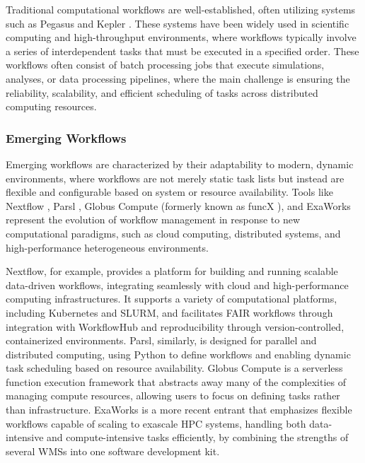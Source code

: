 \documentclass[sigconf]{acmart}
\begin{document}
Traditional computational workflows are well-established, often utilizing systems such as Pegasus \citep{www-pegasus} and Kepler \citep{www-kepler}. These systems have been widely used in scientific computing and high-throughput environments, where workflows typically involve a series of interdependent tasks that must be executed in a specified order. These workflows often consist of batch processing jobs that execute simulations, analyses, or data processing pipelines, where the main challenge is ensuring the reliability, scalability, and efficient scheduling of tasks across distributed computing resources.


\subsubsection{Emerging Workflows}

Emerging workflows are characterized by their adaptability to modern, dynamic environments, where workflows are not merely static task lists but instead are flexible and configurable based on system or resource availability. Tools like Nextflow \citep{di_tommaso_nextflow_2017}, Parsl 
 \citep{babuji2019}, Globus Compute (formerly known as funcX \citep{chard2020}), and ExaWorks \citep{alsaadi2024} represent the evolution of workflow management in response to new computational paradigms, such as cloud computing, distributed systems, and high-performance heterogeneous environments.

Nextflow, for example, provides a platform for building and running scalable data-driven workflows, integrating seamlessly with cloud and high-performance computing infrastructures. It supports a variety of computational platforms, including Kubernetes and SLURM, and facilitates FAIR workflows \citep{wilkinson2025, wilkinson2022} through integration with WorkflowHub \citep{gustafsson2024} and reproducibility through version-controlled, containerized environments. Parsl, similarly, is designed for parallel and distributed computing, using Python to define workflows and enabling dynamic task scheduling based on resource availability. Globus Compute is a serverless function execution framework that abstracts away many of the complexities of managing compute resources, allowing users to focus on defining tasks rather than infrastructure. ExaWorks is a more recent entrant that emphasizes flexible workflows capable of scaling to exascale HPC systems, handling both data-intensive and compute-intensive tasks efficiently, by combining the strengths of several WMSs into one software development kit.
\end{document}
